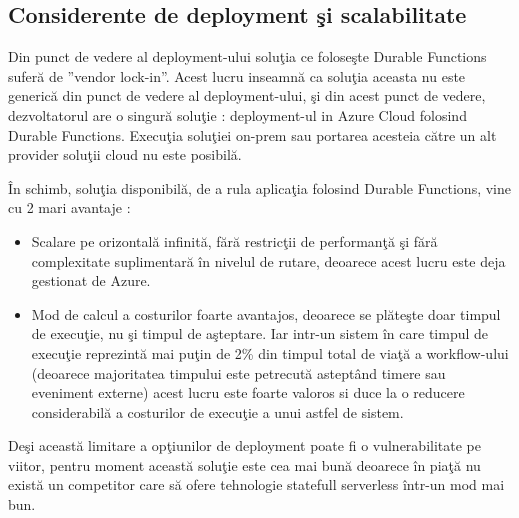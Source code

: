 \subsection{Considerente de deployment şi scalabilitate}
\quad Din punct de vedere al deployment-ului soluţia ce foloseşte Durable Functions suferă de ''vendor lock-in''. Acest lucru inseamnă ca soluţia aceasta nu este generică din punct de vedere al deployment-ului, şi din acest punct de vedere, dezvoltatorul are o singură soluţie : deployment-ul in Azure Cloud folosind Durable Functions. Execuţia soluţiei on-prem sau portarea acesteia către un alt provider soluţii cloud nu este posibilă. 
\par În schimb, soluţia disponibilă, de a rula aplicaţia folosind Durable Functions, vine cu 2 mari avantaje : 
\begin{itemize}
\item Scalare pe orizontală infinită, fără restricţii de performanţă şi fără complexitate suplimentară în nivelul de rutare, deoarece acest lucru este deja gestionat de Azure.
\item Mod de calcul a costurilor foarte avantajos, deoarece se plăteşte doar timpul de execuţie, nu şi timpul de aşteptare. Iar intr-un sistem în care timpul de execuţie reprezintă mai puţin de 2\% din timpul total de viaţă a workflow-ului (deoarece majoritatea timpului este petrecută asteptând timere sau eveniment externe) acest lucru este foarte valoros si duce la o reducere considerabilă a costurilor de execuţie a unui astfel de sistem. 
\end{itemize}
\par Deşi această limitare a opţiunilor de deployment poate fi o vulnerabilitate pe viitor, pentru moment această soluţie este cea mai bună deoarece în piaţă nu există un competitor care să ofere tehnologie statefull serverless într-un mod mai bun.  
